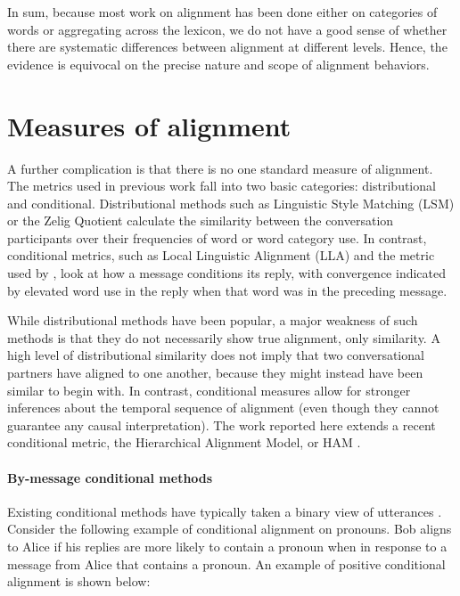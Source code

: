 \documentclass[11pt]{article}
\begin{document}
In sum, because most work on alignment has been done either on categories of words or aggregating across the lexicon, we do not have a good sense of whether there are systematic differences between alignment at different levels. Hence,  the evidence is equivocal on the precise nature and scope of alignment behaviors.



\section{Measures of alignment}

A further complication is that there is no one standard measure of alignment. The metrics used in previous work fall into two basic categories: distributional and conditional. Distributional methods such as Linguistic Style Matching (LSM) \cite{NiederhofferPennebaker2002,IrelandEtAl2011} or the Zelig Quotient \cite{JonesEtAl2014} calculate the similarity between the conversation participants over their frequencies of word or word category use. In contrast, conditional metrics, such as Local Linguistic Alignment (LLA) \cite{FusaroliEtAl2012,WangReitterYen2014} and the metric used by \cite{DNMGamonDumais2011}, look at how a message conditions its reply, with convergence indicated by elevated word use in the reply when that word was in the preceding message.

While distributional methods have been popular, a major weakness of such methods is that they do not necessarily show true alignment, only similarity. A high level of distributional similarity does not imply that two conversational partners have aligned to one another, because they might instead have been similar to begin with. In contrast, conditional measures allow for stronger inferences about the temporal sequence of alignment (even though they cannot guarantee any causal interpretation). The work reported here extends a recent conditional metric, the Hierarchical Alignment Model, or HAM \cite{DoyleYurovskyFrank2016}.


\paragraph{By-message conditional methods} Existing conditional methods have typically taken a binary view of utterances \cite{DNMEtAl2012,DoyleYurovskyFrank2016}. Consider the following example of conditional alignment on pronouns. Bob aligns to Alice if his replies are more likely to contain a pronoun when in response to a message from Alice that contains a pronoun. An example of positive conditional alignment is shown below:
\end{document}
